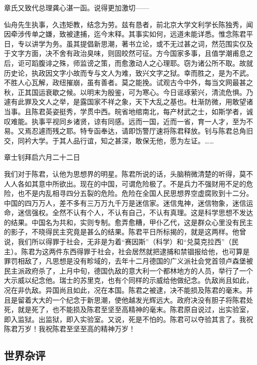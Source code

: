 章氏又致代总理龚心湛一函。说得更加激切——

仙舟先生执事，久违矩教，结念为劳。兹有恳者，前北京大学文利学长陈独秀，闻因牵涉传单之嫌，致被逮捕，迄今末释。其事实如何，远道未能详悉。惟念陈君平日，专以讲学为务。虽其提倡新思潮，著书立论，或不无过甚之词，然范围实仅及于文字方面，决不舍有政治臭味，则固皎然可征。方今国家多事，且值学潮甫息之后，讵可蹈腹诽之殊，师监谤之策，而愈激动人之心理耶。窃为诸公所不取。故就历史论，执政因文字小故而专与文人为难，致兴文字之狱。幸而胜之，是为不武。不胜人心瓦解，政纽摧崩，虽有善者。莫之能挽。试观古今中外，每当文网最甚之秋，正其国运衰歇之候。以明末为殷鉴，可为寒心。今日谣琢萦兴，清流危惧。乃遽有此罪及文人之举，是露国家不祥之象，天下大乱之基也。杜渐防微，用敢望诸当事。且陈君英姿挺秀，学贯中西。皖省地绾南北，每产材武之士，如斯学者，诚叹难能。执事平视同乡诸贤，谅有同感。远而一国，近而一省，育一人才，至为不易。又焉忍遽而残之耶。特专函奉达，请即饬警厅速将陈君释放。钊与陈君总角旧交，同衿大学。于其人品行谊，知之甚深，敢保无他，愿为左证。……

\begin{flushright}章士钊拜启六月二十二日\end{flushright}

我们对于陈君，认他为思想界的明星。陈君所说的话，头脑稍微清楚的听得，莫不人人各如其意中所欲出。现在的中国，可谓危险极了。不是兵力不强财用不足的危险，也不是内乱相寻四分五裂的危险。危险在全国人民思想界空虚腐败到十二分。中国的四万万人，差不多有三万万九千万是迷信家。迷信鬼神，迷信物象，迷信运命，迷信强权。全然不认有个人，不认有自己，不认有真理。这是科学思想不发达的结果。中国名为共和，实则专制。愈弄愈糟，甲仆乙代，这是群众心里没有民主的影子，不晓得民主究竟是甚么的结果。陈君平日所标揭的，就是这两样。他曾说，我们所以得罪于社会，无非是为着“赛因斯”（科学）和“兑莫克拉西”（民主）。陈君为这两件东西得罪于社会，社会居然就把逮捕和禁锢报给他，也可算是罪罚相敌了，凡思想是没有畛域的，去年十二月德国的广义派社会党首领卢森堡被民主派政府杀了，上月中旬，德国仇敌的意大利一个都林地方的人员，举行了一个大示威以纪念他。瑞士的苏里克，也有个同样的示威给他做纪念。仇敌尚且如此，况在非仇敌。异国尚且如此，况在本国。陈君之被逮，决不能损及陈君的毫末。并且是留着大大的一个纪念于新思潮，使他越发光辉远大。政府决没有胆子将陈君处死，就是死了，也不能损及陈君至坚至高精神的毫末。陈君原自说过，出实验室，即入监狱。出监狱，即入实验室。又说，死是不怕的。陈君可以夺验其言了。我祝陈君万岁！我祝陈君至坚至高的精神万岁！

\subsection{世界杂评}

